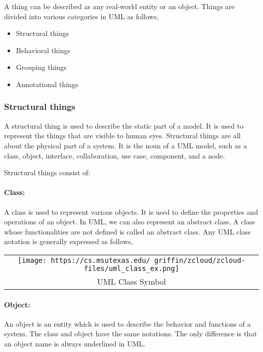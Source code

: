 \documentclass[
]{article}
\providecommand{\tightlist}{%
  \setlength{\itemsep}{0pt}\setlength{\parskip}{0pt}}
\begin{document}
A thing can be described as any real-world entity or an object. Things
are divided into various categories in UML as follows,

\begin{itemize}
\tightlist
\item
  Structural things
\item
  Behavioral things
\item
  Grouping things
\item
  Annotational things
\end{itemize}

\hypertarget{structural-things}{%
\subsubsection{Structural things}\label{structural-things}}

A structural thing is used to describe the static part of a model. It is
used to represent the things that are visible to human eyes. Structural
things are all about the physical part of a system. It is the noun of a
UML model, such as a class, object, interface, collaboration, use case,
component, and a node.

Structural things consist of:

\hypertarget{class}{%
\paragraph{Class:}\label{class}}

A class is used to represent various objects. It is used to define the
properties and operations of an object. In UML, we can also represent an
abstract class. A class whose functionalities are not defined is called
an abstract class. Any UML class notation is generally expressed as
follows,

\begin{longtable}[]{@{}c@{}}
\toprule
\endhead
\texttt{[image: https://cs.msutexas.edu/~griffin/zcloud/zcloud-files/uml\_class\_ex.png]}\tabularnewline
UML Class Symbol\tabularnewline
\bottomrule
\end{longtable}

\hypertarget{object}{%
\paragraph{Object:}\label{object}}

An object is an entity which is used to describe the behavior and
functions of a system. The class and object have the same notations. The
only difference is that an object name is always underlined in UML.
\end{document}
